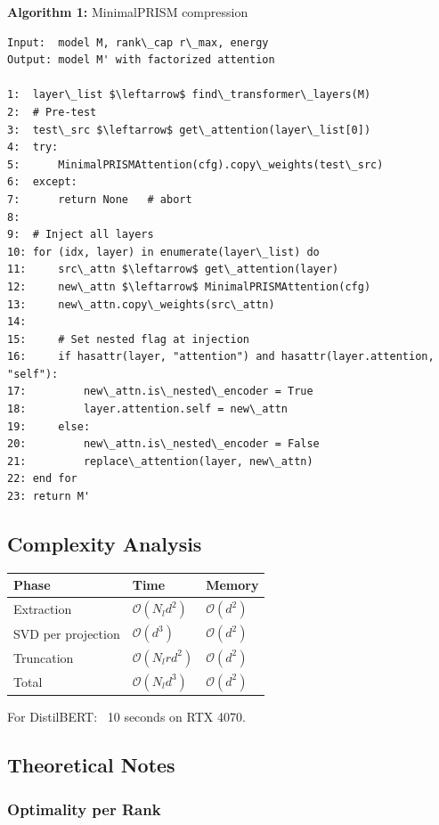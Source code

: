 \textbf{Algorithm 1:} MinimalPRISM compression
\begin{lstlisting}
Input:  model M, rank\_cap r\_max, energy  
Output: model M' with factorized attention

1:  layer\_list $\leftarrow$ find\_transformer\_layers(M)
2:  # Pre-test
3:  test\_src $\leftarrow$ get\_attention(layer\_list[0])
4:  try:
5:      MinimalPRISMAttention(cfg).copy\_weights(test\_src)
6:  except:
7:      return None   # abort
8:
9:  # Inject all layers
10: for (idx, layer) in enumerate(layer\_list) do
11:     src\_attn $\leftarrow$ get\_attention(layer)
12:     new\_attn $\leftarrow$ MinimalPRISMAttention(cfg)
13:     new\_attn.copy\_weights(src\_attn)
14:
15:     # Set nested flag at injection
16:     if hasattr(layer, "attention") and hasattr(layer.attention, "self"):
17:         new\_attn.is\_nested\_encoder = True
18:         layer.attention.self = new\_attn
19:     else:
20:         new\_attn.is\_nested\_encoder = False
21:         replace\_attention(layer, new\_attn)
22: end for
23: return M'
\end{lstlisting}

\subsection{Complexity Analysis}

\begin{table}[H]
\centering
\small
\begin{tabular}{lll}
\toprule
\textbf{Phase} & \textbf{Time} & \textbf{Memory} \\
\midrule
Extraction & $\mathcal{O}(N_l d^2)$ & $\mathcal{O}(d^2)$ \\
SVD per projection & $\mathcal{O}(d^3)$ & $\mathcal{O}(d^2)$ \\
Truncation & $\mathcal{O}(N_l r d^2)$ & $\mathcal{O}(d^2)$ \\
Total & $\mathcal{O}(N_l d^3)$ & $\mathcal{O}(d^2)$ \\
\bottomrule
\end{tabular}
\end{table}

For DistilBERT: ~10 seconds on RTX 4070.

\subsection{Theoretical Notes}

\subsubsection{Optimality per Rank}

